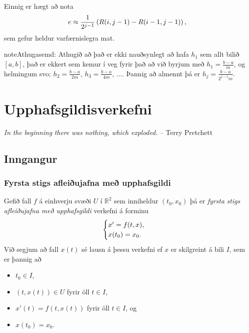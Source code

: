 \documentclass[letterpaper,10pt,icelandic]{sphinxmanual}
\begin{document}
Einnig er hægt að nota
\begin{gather}
\begin{split}e \approx \frac{1}{2^{j-1}}\left( R(i,j-1) - R(i-1,j-1)\right),\end{split}\notag
\end{gather}
sem gefur heldur varfærnislegra mat.

\begin{notice}{note}{Athugasemd:}
Athugið að það er ekki nauðsynlegt að hafa \(h_1\) sem allt bilið
\([a,b]\), það er ekkert sem kemur í veg fyrir það að við byrjum
með \(h_1 = \frac{b-a}{m}\), og helmingum svo;
\(h_2 = \frac{b-a}{2m}\), \(h_3 = \frac{b-a}{4m}\),
\(\ldots\).
Þannig að almennt þá er \(h_j=\frac{b-a}{2^{j-1}m}\).
\end{notice}
\label{kafli06:upphafsgildisverkefni}

\chapter{Upphafsgildisverkefni}
\label{kafli06::doc}\label{kafli06:index-0}\label{kafli06:id1}
\emph{In the beginning there was nothing, which exploded.}
-- Terry Pretchett


\section{Inngangur}
\label{kafli06:inngangur}

\subsection{Fyrsta stigs afleiðujafna með upphafsgildi}
\label{kafli06:index-1}\label{kafli06:fyrsta-stigs-afleiujafna-me-upphafsgildi}
Gefið fall \(f\) á einhverju svæði \(U\) í
\(\mathbb{R}^2\) sem inniheldur \((t_0,x_0)\) þá er
\emph{fyrsta stigs afleiðujafna með upphafsgildi} verkefni á forminu
\begin{gather}
\begin{split}\begin{cases}
x' = f(t,x),\\
x(t_0) = x_0.
\end{cases}\end{split}\notag
\end{gather}
Við segjum að fall \(x(t)\) sé lausn á þessu verkefni ef \(x\) er
skilgreint á bili \(I\), sem er þannig að
\begin{itemize}
\item {} 
\(t_0 \in I\),

\item {} 
\((t,x(t)) \in U\) fyrir öll \(t \in I\),

\item {} 
\(x'(t) = f(t,x(t))\) fyrir öll \(t \in I\), og

\item {} 
\(x(t_0) = x_0\).

\end{itemize}
\end{document}
